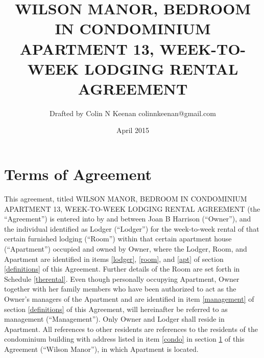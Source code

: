 \documentclass[12pt,letterpaper]{article}
\newcommand{\agreementtitle}{WILSON MANOR, BEDROOM IN CONDOMINIUM APARTMENT 13, WEEK-TO-WEEK LODGING RENTAL AGREEMENT}
\newcommand{\specifics}{Terms of Agreement}
\newcommand{\mom}{Joan B Harrison}
\newcommand{\management}{Management}
\newcommand{\condo}{Wilson Manor}
\newcommand{\apt}{Apartment}
\newcommand{\room}{Room}
\begin{document}
\title{\agreementtitle{}}
\author{Drafted by Colin N Keenan colinnkeenan@gmail.com}
\date{April 2015}
\maketitle
\thispagestyle{fancy}

\noindent \hrulefill
\section{\specifics{}} \label{specifics}
This agreement, titled \agreementtitle{} (the ``Agreement'') is entered into by and between \mom{} (``Owner''), and the individual identified as Lodger (``Lodger'') for the week-to-week rental of that certain furnished lodging (``\room{}'') within that certain apartment house (``\apt{}'') occupied and owned by Owner, where the Lodger, \room{}, and \apt{} are identified in items \ref{lodger}, \ref{room}, and \ref{apt} of section \ref{definitions} of this Agreement. Further details of the \room{} are set forth in Schedule \ref{therental}. Even though personally occupying \apt{}, Owner together with her family members who have been authorized to act as the Owner's managers of the \apt{} and are identified in item \ref{management} of section \ref{definitions} of this Agreement, will hereinafter be referred to as management (``\management{}''). Only Owner and Lodger shall reside in \apt{}. All references to other residents are references to the residents of the condominium building with address listed in item \ref{condo} in section \ref{specifics} of this Agreement (``\condo{}''), in which \apt{} is located.
\end{document}

